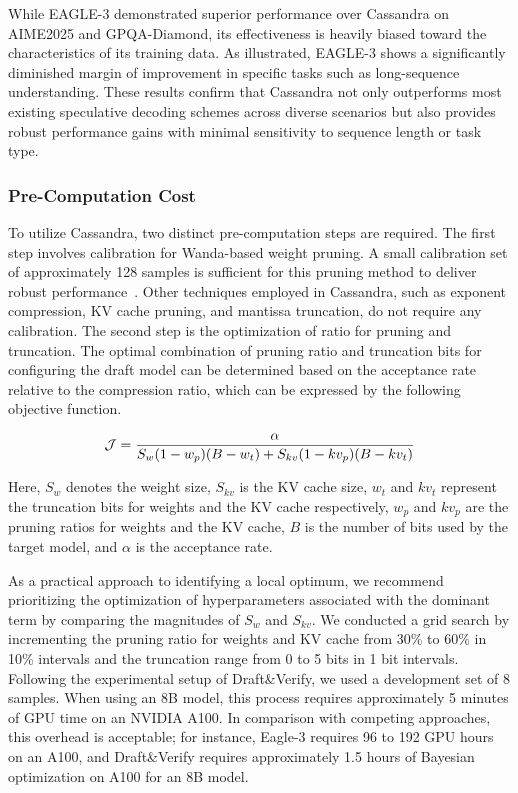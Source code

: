 While EAGLE-3 demonstrated superior performance over Cassandra on AIME2025 and GPQA-Diamond, its effectiveness is heavily biased toward the characteristics of its training data. As illustrated, EAGLE-3 shows a significantly diminished margin of improvement in specific tasks such as long-sequence understanding. These results confirm that Cassandra not only outperforms most existing speculative decoding schemes across diverse scenarios but also provides robust performance gains with minimal sensitivity to sequence length or task type.

\subsubsection{Pre-Computation Cost}

To utilize Cassandra, two distinct pre-computation steps are required. The first step involves calibration for Wanda-based weight pruning. A small calibration set of approximately 128 samples is sufficient for this pruning method to deliver robust performance~\cite{Wanda}. Other techniques employed in Cassandra, such as exponent compression, KV cache pruning, and mantissa truncation, do not require any calibration. The second step is the optimization of ratio for pruning and truncation. The optimal combination of pruning ratio and truncation bits for configuring the draft model can be determined based on the acceptance rate relative to the compression ratio, which can be expressed by the following objective function.

\begin{equation}
\text{\small} %
\mathcal{J} = \frac{\alpha}{S_w(1 - w_p)(B - w_t) + S_{kv}(1 - kv_p)(B - kv_t)}
\end{equation}
\vspace{0.03in}

Here, $S_w$ denotes the weight size, $S_{kv}$ is the KV cache size, $w_t$ and $kv_t$ represent the truncation bits for weights and the KV cache respectively, $w_p$ and $kv_p$ are the pruning ratios for weights and the KV cache, $B$ is the number of bits used by the target model, and $\alpha$ is the acceptance rate.

As a practical approach to identifying a local optimum, we recommend prioritizing the optimization of hyperparameters associated with the dominant term by comparing the magnitudes of $S_w$ and $S_{kv}$. We conducted a grid search by incrementing the pruning ratio for weights and KV cache from 30\% to 60\% in 10\% intervals and the truncation range from 0 to 5 bits in 1 bit intervals. Following the experimental setup of Draft\&Verify, we used a development set of 8 samples. When using an 8B model, this process requires approximately 5 minutes of GPU time on an NVIDIA A100. In comparison with competing approaches, this overhead is acceptable; for instance, Eagle-3 requires 96 to 192 GPU hours on an A100, and Draft\&Verify requires approximately 1.5 hours of Bayesian optimization on A100 for an 8B model.

